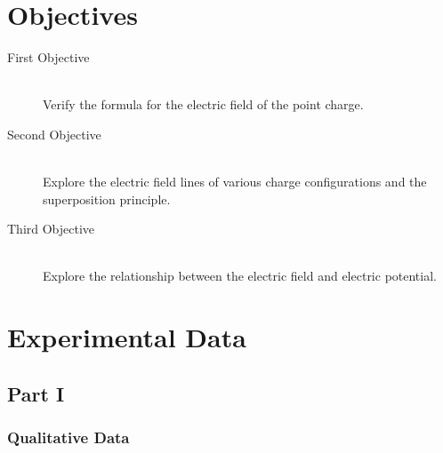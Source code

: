 \documentclass{article}
\begin{document}
\section{Objectives}


\begin{description}
	\item[First Objective] \hfill \\
		Verify the formula for the electric field of the point charge.
	\item[Second Objective] \hfill \\
		Explore the electric field lines of various charge configurations and the
		superposition principle.
	\item[Third Objective] \hfill \\
		Explore the relationship between the electric field and electric potential.
\end{description}



\section{Experimental Data}

\subsection{Part I}%
\label{sub:part_one}

\subsubsection{Qualitative Data}%
\label{ssub:qualitative_data}
\end{document}
